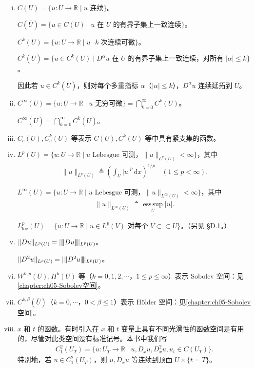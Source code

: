 \documentclass[../main.tex]{subfiles}
\begin{document}
\begin{enumerate}[(i)]
\item $C(U)=\{u:U\to\mathbb{R}\mid u\text{ 连续}\}$。

$C(\overline{U})=\{u\in C(U)\mid u\text{ 在 }U\text{ 的有界子集上一致连续}\}$。

$C^k(U)=\{u:U\to\mathbb{R}\mid u\text{ }k\text{ 次连续可微}\}$。

$C^k(\overline{U})=\{u\in C^k(U)\mid D^\alpha u\text{ 在 }U\text{ 的有界子集上一致连续，对所有 }|\alpha|\leqslant k\}$。

因此若 $u\in C^k(\overline{U})$，则对每个多重指标 $\alpha$（$|\alpha|\leqslant k$），$D^\alpha u$ 连续延拓到 $\overline{U}$。

\item $C^\infty(U)=\{u:U\to\mathbb{R}\mid u\text{ 无穷可微}\}=\bigcap_{k=0}^\infty C^k(U)$。

$C^\infty(\overline{U})=\bigcap_{k=0}^\infty C^k(\overline{U})$。

\item $C_c(U),C_c^k(U)$ 等表示 $C(U),C^k(U)$ 等中具有紧支集的函数。

\item $L^p(U)=\{u:U\to\mathbb{R}\mid u\text{ Lebesgue 可测，}\|u\|_{L^p(U)}<\infty\}$，其中
\begin{align*}
\|u\|_{L^p(U)}\triangleq\left(\int_U|u|^p\,\mathrm{d}x\right)^{1/p} \quad (1\leqslant p<\infty).
\end{align*}

$L^\infty(U)=\{u:U\to\mathbb{R}\mid u\text{ Lebesgue 可测，}\|u\|_{L^\infty(U)}<\infty\}$，其中
\begin{align*}
\|u\|_{L^\infty(U)}\triangleq\operatorname*{ess\,sup}_U|u|.
\end{align*}

$L^p_{\mathrm{loc}}(U)=\{u:U\to\mathbb{R}\mid u\in L^p(V)\text{ 对每个 }V\subset\subset U\}$。（另见 \S D.1。）

\item $\|Du\|_{L^p(U)}=\|\!\| Du\|\!\|_{L^p(U)}$。

$\|D^2u\|_{L^p(U)}=\|\!\| D^2u\|\!\|_{L^p(U)}$。

\item $W^{k,p}(U),H^k(U)$ 等（$k=0,1,2,\cdots$，$1\leqslant p\leqslant\infty$）表示 Sobolev 空间：见\cref{chapter:ch05-Sobolev空间}。

\item $C^{k,\beta}(\overline{U})$（$k=0,\cdots$，$0<\beta\leqslant 1$）表示 H\"older 空间：见\cref{chapter:ch05-Sobolev空间}。

\item $x$ 和 $t$ 的函数。有时引入在 $x$ 和 $t$ 变量上具有不同光滑性的函数空间是有用的，尽管对此类空间没有标准记号。本书中我们写
\begin{align*}
C^2_1(U_T)=\{u:U_T\to\mathbb{R}\mid u,D_xu,D_x^2u,u_t\in C(U_T)\}.
\end{align*}
特别地，若 $u\in C^2_1(U_T)$，则 $u,D_xu$ 等连续到顶面 $U\times\{t=T\}$。
\end{enumerate}
\end{document}
